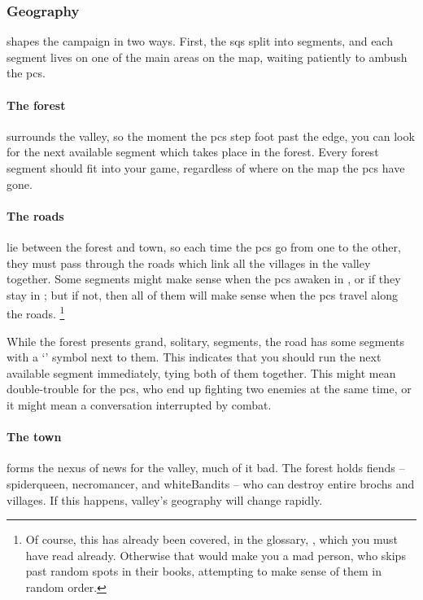 \begin{multicols}{2}
\subsubsection{Geography}
shapes the \gls{campaign} in two ways.
First, the \glspl{sq} split into \glspl{segment}, and each \gls{segment} lives on one of the main areas on the map, waiting patiently to ambush the \glspl{pc}.

\paragraph{The forest}
surrounds the \gls{valley}, so the moment the \glspl{pc} step foot past the \gls{edge}, you can look for the next available \gls{segment} which takes place in the forest.
Every forest \gls{segment} should fit into your game, regardless of where on the map the \glspl{pc} have gone.

\paragraph{The roads}
lie between the forest and town, so each time the \glspl{pc} go from one to the other, they must pass through the roads which link all the \glspl{village} in the \gls{valley} together.
Some \glspl{segment} might make sense when the \glspl{pc} awaken in , or if they stay in ; but if not, then all of them will make sense when the \glspl{pc} travel along the roads.%
\footnote{Of course, this has already been covered, in the glossary, , which you must have read already.
Otherwise that would make you a mad person, who skips past random spots in their books, attempting to make sense of them in random order.}

While the forest presents grand, solitary, \glspl{segment}, the road has some \glspl{segment} with a `\squash' symbol next to them.
This indicates that you should run the next available \gls{segment} immediately, tying both of them together.
This might mean double-trouble for the \glspl{pc}, who end up fighting two enemies at the same time, or it might mean a conversation interrupted by combat.

\paragraph{The town}
forms the nexus of news for the \gls{valley}, much of it bad.
The forest holds \glspl{fiend} -- \gls{spiderqueen}, \gls{necromancer}, and \gls{whiteBandits} -- who can destroy entire \glspl{broch} and \glspl{village}.
If this happens, \gls{valley}'s geography will change rapidly.


\end{multicols}
